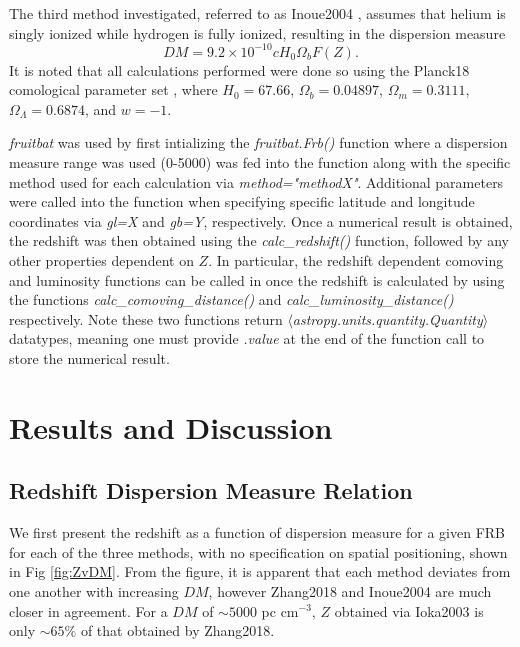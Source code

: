 \documentclass{article}
\begin{document}
The third method investigated, referred to as Inoue2004 \cite{Inoue2004}, assumes that helium is singly ionized while hydrogen is fully ionized, resulting in the dispersion measure
\begin{equation}
    DM=9.2\times10^{-10}c H_0 \Omega_b F(Z).
\end{equation}
It is noted that all calculations performed were done so using the Planck18 comological parameter set \cite{Planck2018}, where $H_0=67.66$, $\Omega_b=0.04897$, $\Omega_m=0.3111$, $\Omega_\Lambda=0.6874$, and $w=-1$.

{\it fruitbat} was used by first intializing the \emph{fruitbat.Frb()} function where a dispersion measure range was used (0-5000) was fed into the function along with the specific method used for each calculation via \emph{method="methodX"}. Additional parameters were called into the function when specifying specific latitude and longitude coordinates via \emph{gl=X} and \emph{gb=Y}, respectively. Once a numerical result is obtained, the redshift was then obtained using the \emph{calc\_redshift()} function, followed by any other properties dependent on $Z$. In particular, the redshift dependent comoving and luminosity functions can be called in once the redshift is calculated by using the functions \emph{calc\_comoving\_distance()} and \emph{calc\_luminosity\_distance()} respectively. Note these two functions return {$\langle$\emph{astropy.units.quantity.Quantity}$\rangle$} datatypes, meaning one must provide \emph{.value} at the end of the function call to store the numerical result.

\section{Results and Discussion}

\subsection{Redshift Dispersion Measure Relation}

We first present the redshift as a function of dispersion measure for a given FRB for each of the three methods, with no specification on spatial positioning, shown in Fig \ref{fig:ZvDM}. From the figure, it is apparent that each method deviates from one another with increasing $DM$, however Zhang2018 and Inoue2004 are much closer in agreement. For a $DM$ of $\sim5000$ pc cm$^{-3}$, $Z$ obtained via Ioka2003 is only $\sim65\%$ of that obtained by Zhang2018.  
\end{document}
